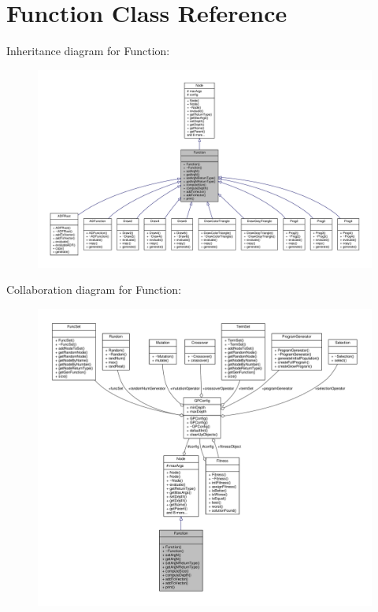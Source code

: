 \hypertarget{classFunction}{}\section{Function Class Reference}
\label{classFunction}


Inheritance diagram for Function\+:
\nopagebreak
\begin{figure}[H]
\begin{center}
\leavevmode
\includegraphics[width=350pt]{classFunction__inherit__graph}
\end{center}
\end{figure}


Collaboration diagram for Function\+:
\nopagebreak
\begin{figure}[H]
\begin{center}
\leavevmode
\includegraphics[width=350pt]{classFunction__coll__graph}
\end{center}
\end{figure}
